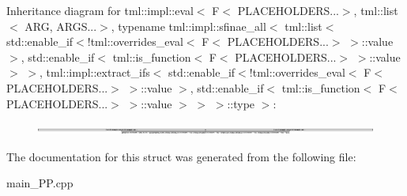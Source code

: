 Inheritance diagram for tml\+:\+:impl\+:\+:eval$<$ F$<$ P\+L\+A\+C\+E\+H\+O\+L\+D\+E\+R\+S...$>$, tml\+:\+:list$<$ A\+R\+G, A\+R\+G\+S...$>$, typename tml\+:\+:impl\+:\+:sfinae\+\_\+all$<$ tml\+:\+:list$<$ std\+:\+:enable\+\_\+if$<$!tml\+:\+:overrides\+\_\+eval$<$ F$<$ P\+L\+A\+C\+E\+H\+O\+L\+D\+E\+R\+S...$>$ $>$\+:\+:value $>$, std\+:\+:enable\+\_\+if$<$ tml\+:\+:is\+\_\+function$<$ F$<$ P\+L\+A\+C\+E\+H\+O\+L\+D\+E\+R\+S...$>$ $>$\+:\+:value $>$ $>$, tml\+:\+:impl\+:\+:extract\+\_\+ifs$<$ std\+:\+:enable\+\_\+if$<$!tml\+:\+:overrides\+\_\+eval$<$ F$<$ P\+L\+A\+C\+E\+H\+O\+L\+D\+E\+R\+S...$>$ $>$\+:\+:value $>$, std\+:\+:enable\+\_\+if$<$ tml\+:\+:is\+\_\+function$<$ F$<$ P\+L\+A\+C\+E\+H\+O\+L\+D\+E\+R\+S...$>$ $>$\+:\+:value $>$ $>$ $>$\+:\+:type $>$\+:\begin{figure}[H]
\begin{center}
\leavevmode
\includegraphics[height=0.232558cm]{structtml_1_1impl_1_1eval_3_01F_3_01PLACEHOLDERS_8_8_8_4_00_01tml_1_1list_3_01ARG_00_01ARGS_8_8_1eee24c54c2e97ae09b1cab8d0280fd9}
\end{center}
\end{figure}


The documentation for this struct was generated from the following file\+:\begin{DoxyCompactItemize}
\item 
main\+\_\+\+P\+P.\+cpp\end{DoxyCompactItemize}
